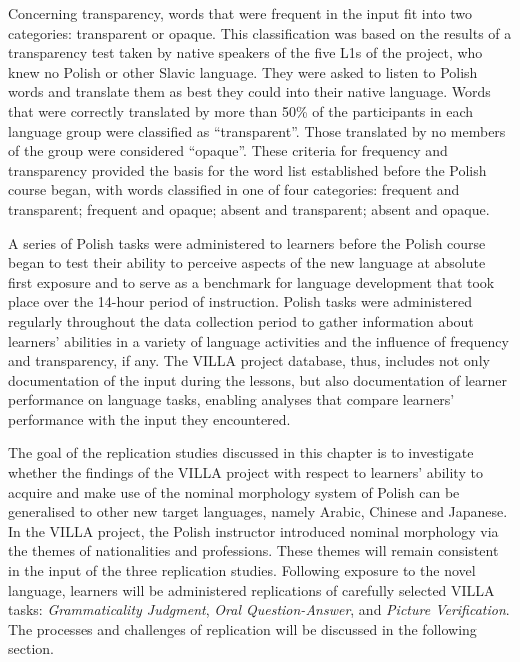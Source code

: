 \documentclass[12pt]{article}
\newenvironment{styleStandard}{\setlength\leftskip{0cm}\setlength\rightskip{0cm plus 1fil}\setlength\parindent{0cm}\setlength\parfillskip{0pt plus 1fil}\setlength\parskip{0cm plus 1pt}\writerlistparindent\writerlistleftskip\leavevmode\normalfont\normalsize\writerlistlabel\ignorespaces}{\unskip\vspace{0cm plus 1pt}\par}
\newcommand\writerlistleftskip{}
\newcommand\writerlistparindent{}
\newcommand\writerlistlabel{}
\begin{document}
\begin{styleStandard}
Concerning transparency, words that were frequent in the input fit into two categories: transparent or opaque. This classification was based on the results of a transparency test taken by native speakers of the five L1s of the project, who knew no Polish or other Slavic language. They were asked to listen to Polish words and translate them as best they could into their native language. Words that were correctly translated by more than 50\% of the participants in each language group were classified as “transparent”. Those translated by no members of the group were considered “opaque”. These criteria for frequency and transparency provided the basis for the word list established before the Polish course began, with words classified in one of four categories: frequent and transparent; frequent and opaque; absent and transparent; absent and opaque.
\end{styleStandard}

\begin{styleStandard}
A series of Polish tasks were administered to learners before the Polish course began to test their ability to perceive aspects of the new language at absolute first exposure and to serve as a benchmark for language development that took place over the 14-hour period of instruction. Polish tasks were administered regularly throughout the data collection period to gather information about learners’ abilities in a variety of language activities and the influence of frequency and transparency, if any. The VILLA project database, thus, includes not only documentation of the input during the lessons, but also documentation of learner performance on language tasks, enabling analyses that compare learners’ performance with the input they encountered.
\end{styleStandard}

\begin{styleStandard}
The goal of the replication studies discussed in this chapter is to investigate whether the findings of the VILLA project with respect to learners’ ability to acquire and make use of the nominal morphology system of Polish can be generalised to other new target languages, namely Arabic, Chinese and Japanese. In the VILLA project, the Polish instructor introduced nominal morphology via the themes of nationalities and professions. These themes will remain consistent in the input of the three replication studies. Following exposure to the novel language, learners will be administered replications of carefully selected VILLA tasks: \textit{Grammaticality Judgment}, \textit{Oral Question-Answer}, and \textit{Picture Verification}. The processes and challenges of replication will be discussed in the following section. 
\end{styleStandard}
\end{document}
